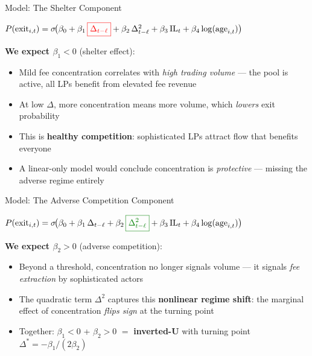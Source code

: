 \documentclass[aspectratio=169]{beamer}
\newcommand{\DeltaStar}{\Delta^{*}}
\begin{document}
\begin{frame}{Model: The Shelter Component}

\begin{center}
$P(\text{exit}_{i,t}) = \sigma\!\bigl(
  \beta_0
  + \beta_1 \,\textcolor{red}{\boxed{\Delta_{t-\ell}}}
  + \beta_2 \,\Delta_{t-\ell}^2
  + \beta_3 \,\text{IL}_t
  + \beta_4 \log(\text{age}_{i,t})
\bigr)$
\end{center}

\bigskip

\textbf{We expect $\beta_1 < 0$} (shelter effect):

\begin{itemize}
  \item Mild fee concentration correlates with \emph{high trading volume}
    --- the pool is active, all LPs benefit from elevated fee revenue

  \item At low $\Delta$, more concentration means more volume,
    which \emph{lowers} exit probability

  \item This is \textbf{healthy competition}: sophisticated LPs attract flow
    that benefits everyone \citep{capponi2024jit}

  \item A linear-only model would conclude concentration is \emph{protective}
    --- missing the adverse regime entirely
\end{itemize}

\end{frame}

\begin{frame}{Model: The Adverse Competition Component}

\begin{center}
$P(\text{exit}_{i,t}) = \sigma\!\bigl(
  \beta_0
  + \beta_1 \,\Delta_{t-\ell}
  + \beta_2 \,\textcolor{green!50!black}{\boxed{\Delta_{t-\ell}^2}}
  + \beta_3 \,\text{IL}_t
  + \beta_4 \log(\text{age}_{i,t})
\bigr)$
\end{center}

\bigskip

\textbf{We expect $\beta_2 > 0$} (adverse competition):

\begin{itemize}
  \item Beyond a threshold, concentration no longer signals volume ---
    it signals \emph{fee extraction} by sophisticated actors

  \item The quadratic term $\Delta^2$ captures this \textbf{nonlinear regime shift}:
    the marginal effect of concentration \emph{flips sign} at the turning point

  \item Together: $\beta_1 < 0$ + $\beta_2 > 0$ $=$ \textbf{inverted-U} with
    turning point $\DeltaStar = -\beta_1 / (2\beta_2)$
\end{itemize}

\end{frame}
\end{document}
